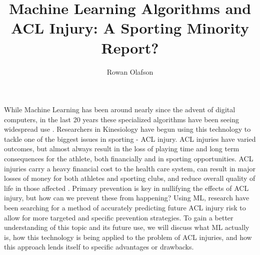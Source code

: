 \documentclass[stu,12pt,floatsintext]{apa7}
\title{Machine Learning Algorithms and ACL Injury: A Sporting Minority Report?} %
\author{Rowan Olafson}
\affiliation{Univresity of Calgary}
\begin{document}
\maketitle %


While Machine Learning has been around nearly since the advent of digital computers, in the last 20 years these specialized algorithms have been seeing widespread use \parencite{MLhistory}. Researchers in Kinesiology have begun using this technology to tackle one of the biggest issues in sporting - ACL injury. ACL injuries have varied outcomes, but almost always result in the loss of playing time and long term consequences for the athlete, both financially and in sporting opportunities. ACL injuries carry a heavy financial cost to the health care system, can result in major losses of money for both athletes and sporting clubs, and reduce overall quality of life in those affected \parencite{Filbay_2022}. Primary prevention is key in nullifying the effects of ACL injury, but how can we prevent these from happening? Using ML, research have been searching for a method of accurately predicting future ACL injury risk to allow for more targeted and specific prevention strategies. To gain a better understanding of this topic and its future use, we will discuss what ML actually is, how this technology is being applied to the problem of ACL injuries, and how this approach lends itself to specific advantages or drawbacks.
\end{document}
